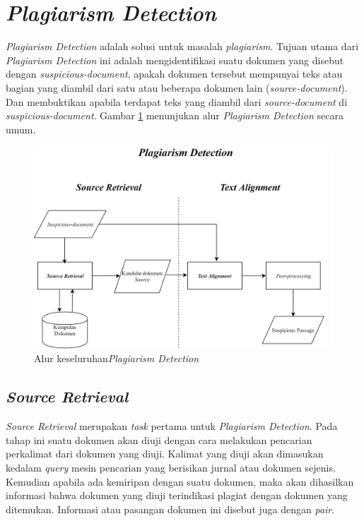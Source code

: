\documentclass[../Proposal.tex]{subfiles}
\begin{document}
	\section{\textit{Plagiarism Detection}}
	\textit{Plagiarism Detection} adalah solusi untuk masalah \textit{plagiarism}. Tujuan utama dari \textit{Plagiarism Detection} ini adalah mengidentifikasi suatu dokumen yang disebut dengan \textit{suspicious-document}, apakah dokumen tersebut mempunyai teks atau bagian yang diambil dari satu atau beberapa dokumen lain (\textit{source-document}). Dan membuktikan apabila terdapat teks yang diambil dari \textit{source-document} di \textit{suspicious-document}. Gambar \ref{fig:alurplagdect} menunjukan alur \textit{Plagiarism Detection} secara umum\cite{pan-task-2014,overview6}.
	
	\begin{figure}[H]
		\includegraphics[width=1\linewidth]{"../images/Plagiarism Detection Generic"}
		\caption{Alur keseluruhan\textit{Plagiarism Detection}\cite{overview6}}
		\label{fig:alurplagdect}
	\end{figure}
	
		\subsection{\textit{Source Retrieval}}
		\textit{Source Retrieval} merupakan \textit{task} pertama untuk \textit{Plagiarism Detection}. Pada tahap ini suatu dokumen akan diuji dengan cara melakukan pencarian perkalimat dari dokumen yang diuji. Kalimat yang diuji akan dimasukan kedalam \textit{query} mesin pencarian yang berisikan jurnal atau dokumen sejenis. Kemudian apabila ada kemiripan dengan suatu dokumen, maka akan dihasilkan informasi bahwa dokumen yang diuji terindikasi plagiat dengan dokumen yang ditemukan\cite{information-retrieval}. Informasi atau pasangan dokumen ini disebut juga dengan \textit{pair}.
		
\end{document}

